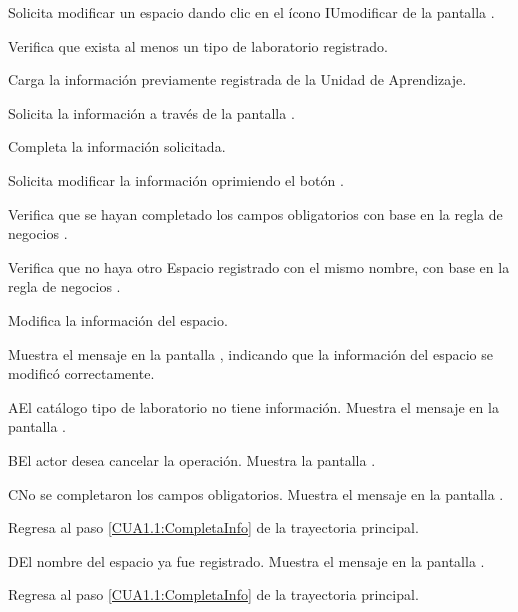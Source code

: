 \begin{UCtrayectoria}
	\UCpaso [\UCactor] Solicita modificar un espacio dando clic en el ícono  IUmodificar 
	de la pantalla . 
	
	\UCpaso [\UCsist] Verifica que exista al menos un tipo de laboratorio registrado. 

	\UCpaso [\UCsist] Carga la información previamente registrada de la Unidad de Aprendizaje.

	\UCpaso[\UCsist] Solicita la información a través de la pantalla .
	
	\UCpaso [\UCactor] Completa la información solicitada. \label{CUI1.5.1:CompletaInfo}
	
	\UCpaso [\UCactor] Solicita modificar la información oprimiendo el botón . 
	
	\UCpaso [\UCsist] Verifica que se hayan completado los campos obligatorios con base en la regla de negocios . 
		
	\UCpaso [\UCsist] Verifica que no haya otro Espacio registrado con el mismo nombre, con base en la regla de negocios . 
	
	\UCpaso [\UCsist] Modifica la información del espacio.
	
	\UCpaso [\UCsist] Muestra el mensaje  en la pantalla , indicando que la información del espacio se modificó correctamente.	
	
\end{UCtrayectoria}

\begin{UCtrayectoriaA}{A}{El catálogo tipo de laboratorio no tiene información.}
	\UCpaso [\UCsist] Muestra el mensaje  en la pantalla . 
\end{UCtrayectoriaA}

\begin{UCtrayectoriaA}{B}{El actor desea cancelar la operación.}
	\UCpaso [\UCsist] Muestra la pantalla . 
\end{UCtrayectoriaA}

\begin{UCtrayectoriaA}{C}{No se completaron los campos obligatorios.}
	\UCpaso [\UCsist] Muestra el mensaje  en la pantalla .
	
	\UCpaso Regresa al paso \ref{CUA1.1:CompletaInfo} de la trayectoria principal.
\end{UCtrayectoriaA}

\begin{UCtrayectoriaA}{D}{El nombre del espacio ya fue registrado.}
	\UCpaso [\UCsist] Muestra el mensaje  en la pantalla .
	
	\UCpaso Regresa al paso \ref{CUA1.1:CompletaInfo} de la trayectoria principal.
\end{UCtrayectoriaA}